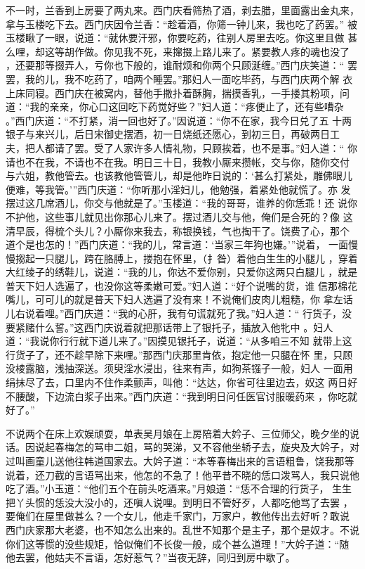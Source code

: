 不一时，兰香到上房要了两丸来。西门庆看筛热了酒，剥去腊，里面露出金丸来，
拿与玉楼吃下去。西门庆因令兰香：“趁着酒，你筛一钟儿来，我也吃了药罢。”
被玉楼瞅了一眼，说道：“就休要汗邪，你要吃药，往别人房里去吃。你这里且做
甚么哩，却这等胡作做。你见我不死，来撺掇上路儿来了。紧要教人疼的魂也没了
，还要那等掇弄人，亏你也下般的，谁耐烦和你两个只顾涎缠。”西门庆笑道：“
罢罢，我的儿，我不吃药了，咱两个睡罢。”那妇人一面吃毕药，与西门庆两个解
衣上床同寝。西门庆在被窝内，替他手撒扑着酥胸，揣摸香乳，一手搂其粉项，问
道：“我的亲亲，你心口这回吃下药觉好些？”妇人道：“疼便止了，还有些嘈杂
。”西门庆道：“不打紧，消一回也好了。”因说道：“你不在家，我今日兑了五
十两银子与来兴儿，后日宋御史摆酒，初一日烧纸还愿心，到初三日，再破两日工
夫，把人都请了罢。受了人家许多人情礼物，只顾挨着，也不是事。”妇人道：“
你请也不在我，不请也不在我。明日三十日，我教小厮来攒帐，交与你，随你交付
与六姐，教他管去。也该教他管管儿，却是他昨日说的：‘甚么打紧处，雕佛眼儿
便难，等我管。’”西门庆道：“你听那小淫妇儿，他勉强，着紧处他就慌了。亦
发摆过这几席酒儿，你交与他就是了。”玉楼道：“我的哥哥，谁养的你恁乖！还
说你不护他，这些事儿就见出你那心儿来了。摆过酒儿交与他，俺们是合死的？像
这清早辰，得梳个头儿？小厮你来我去，称银换钱，气也掏干了。饶费了心，那个
道个是也怎的！”西门庆道：“我的儿，常言道：‘当家三年狗也嫌。’”说着，
一面慢慢搊起一只腿儿，跨在胳膊上，搂抱在怀里，（扌昝）着他白生生的小腿儿
，穿着大红绫子的绣鞋儿，说道：“我的儿，你达不爱你别，只爱你这两只白腿儿
，就是普天下妇人选遍了，也没你这等柔嫩可爱。”妇人道：“好个说嘴的货，谁
信那棉花嘴儿，可可儿的就是普天下妇人选遍了没有来！不说俺们皮肉儿粗糙，你
拿左话儿右说着哩。”西门庆道：“我的心肝，我有句谎就死了我。”妇人道：“
行货子，没要紧赌什么誓。”这西门庆说着就把那话带上了银托子，插放入他牝中
。妇人道：“我说你行行就下道儿来了。”因摸见银托子，说道：“从多咱三不知
就带上这行货子了，还不趁早除下来哩。”那西门庆那里肯依，抱定他一只腿在怀
里，只顾没棱露脑，浅抽深送。须臾淫水浸出，往来有声，如狗茶镪子一般，妇人
一面用绢抹尽了去，口里内不住作柔颤声，叫他：“达达，你省可往里边去，奴这
两日好不腰酸，下边流白浆子出来。”西门庆道：“我到明日问任医官讨服暖药来
，你吃就好了。”

不说两个在床上欢娱顽耍，单表吴月娘在上房陪着大妗子、三位师父，晚夕坐的说
话。因说起春梅怎的骂申二姐，骂的哭涕，又不容他坐轿子去，旋央及大妗子，对
过叫画童儿送他往韩道国家去。大妗子道：“本等春梅出来的言语粗鲁，饶我那等
说着，还刀截的言语骂出来，他怎的不急了！他平昔不晓的恁口泼骂人，我只说他
吃了酒。”小玉道：“他们五个在前头吃酒来。”月娘道：“恁不合理的行货子，
生生把丫头惯的恁没大没小的，还嗔人说哩。到明日不管好歹，人都吃他骂了去罢
，要俺们在屋里做甚么？一个女儿，他走千家门，万家户，教他传出去好听？敢说
西门庆家那大老婆，也不知怎么出来的。乱世不知那个是主子，那个是奴才。不说
你们这等惯的没些规矩，恰似俺们不长俊一般，成个甚么道理！”大妗子道：“随
他去罢，他姑夫不言语，怎好惹气？”当夜无辞，同归到房中歇了。

